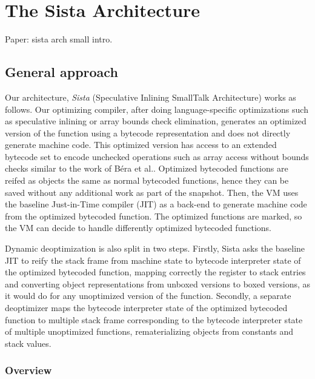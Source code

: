 \documentclass[a4paper,12pt,twoside]{../includes/ThesisStyle}
\begin{document}
\fi

\chapter{The Sista Architecture}
\label{chap:archTheory}
\minitoc

Paper: sista arch
small intro. 

\section{General approach}

Our architecture, \emph{Sista} (Speculative Inlining SmallTalk Architecture) works as follows. Our optimizing compiler, after doing language-specific optimizations such as speculative inlining or array bounds check elimination, generates an optimized version of the function using a bytecode representation and does not directly generate machine code. This optimized version has access to an extended bytecode set to encode unchecked operations such as array access without bounds checks similar to the work of B\'era et al.\cite{Bera14a}. Optimized bytecoded functions are reifed as objects the same as normal bytecoded functions, hence they can be saved without any additional work as part of the snapshot. Then, the VM uses the baseline Just-in-Time compiler (JIT) as a back-end to generate machine code from the optimized bytecoded function. The optimized functions are marked, so the VM can decide to handle differently optimized bytecoded functions. 

Dynamic deoptimization is also split in two steps. Firstly, Sista asks the baseline JIT to reify the stack frame from machine state to bytecode interpreter state of the optimized bytecoded function, mapping correctly the register to stack entries and converting object representations from unboxed versions to boxed versions, as it would do for any unoptimized version of the function. Secondly, a separate deoptimizer maps the bytecode interpreter state of the optimized bytecoded function to multiple stack frame corresponding to the bytecode interpreter state of multiple unoptimized functions, rematerializing objects from constants and stack values.

\subsection{Overview}



\end{document}
